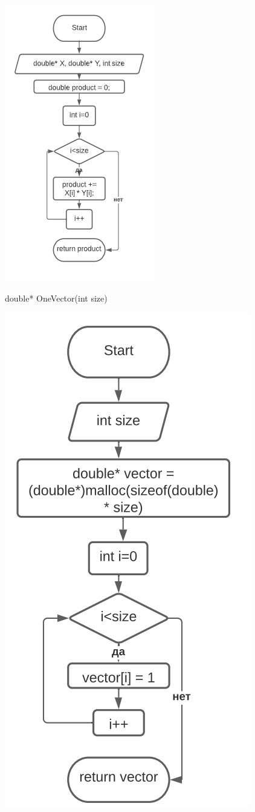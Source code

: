\includegraphics[scale=0.7]{block3.png}

double* OneVector(int size)

\includegraphics[scale=0.6]{block4.png}

